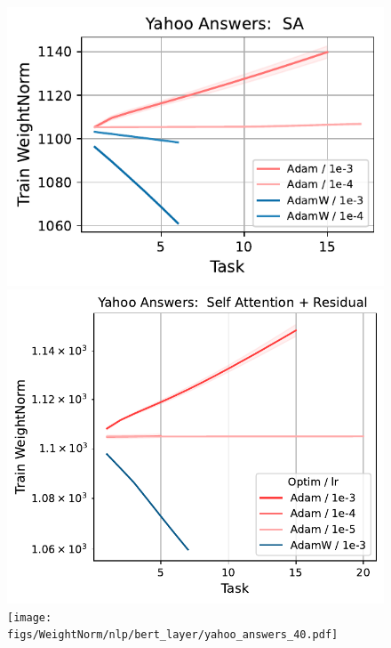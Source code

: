 \begin{figure}[htb!]
{    \includegraphics[width=\textwidth]{figs/WeightNorm/nlp/attention/yahoo_answers_40.pdf}
    \includegraphics[width=\textwidth]{figs/WeightNorm/nlp/attention_residual/yahoo_answers_40.pdf}
    \texttt{[image: figs/WeightNorm/nlp/bert\_layer/yahoo\_answers\_40.pdf]}
    }\\    
\end{figure}

